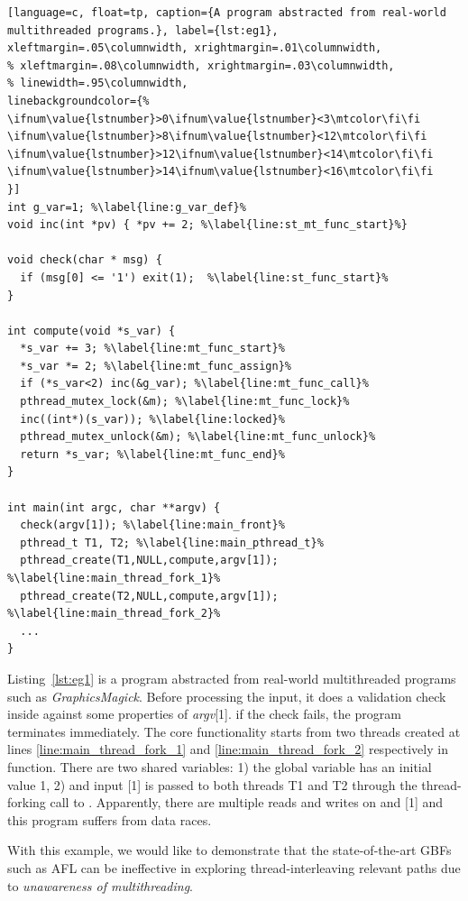 \begin{lstlisting}[language=c, float=tp, caption={A program abstracted from real-world multithreaded programs.}, label={lst:eg1},
xleftmargin=.05\columnwidth, xrightmargin=.01\columnwidth,
% xleftmargin=.08\columnwidth, xrightmargin=.03\columnwidth,
% linewidth=.95\columnwidth, 
linebackgroundcolor={%
\ifnum\value{lstnumber}>0\ifnum\value{lstnumber}<3\mtcolor\fi\fi
\ifnum\value{lstnumber}>8\ifnum\value{lstnumber}<12\mtcolor\fi\fi
\ifnum\value{lstnumber}>12\ifnum\value{lstnumber}<14\mtcolor\fi\fi
\ifnum\value{lstnumber}>14\ifnum\value{lstnumber}<16\mtcolor\fi\fi
}]
int g_var=1; %\label{line:g_var_def}%
void inc(int *pv) { *pv += 2; %\label{line:st_mt_func_start}%}

void check(char * msg) {
  if (msg[0] <= '1') exit(1);  %\label{line:st_func_start}%
}

int compute(void *s_var) {
  *s_var += 3; %\label{line:mt_func_start}%
  *s_var *= 2; %\label{line:mt_func_assign}%
  if (*s_var<2) inc(&g_var); %\label{line:mt_func_call}%
  pthread_mutex_lock(&m); %\label{line:mt_func_lock}%
  inc((int*)(s_var)); %\label{line:locked}%
  pthread_mutex_unlock(&m); %\label{line:mt_func_unlock}%
  return *s_var; %\label{line:mt_func_end}%
}

int main(int argc, char **argv) {
  check(argv[1]); %\label{line:main_front}%
  pthread_t T1, T2; %\label{line:main_pthread_t}%
  pthread_create(T1,NULL,compute,argv[1]);  %\label{line:main_thread_fork_1}%
  pthread_create(T2,NULL,compute,argv[1]);  %\label{line:main_thread_fork_2}%
  ...
}
\end{lstlisting}



Listing~\ref{lst:eg1} is a program abstracted from real-world multithreaded programs such as \emph{GraphicsMagick}. Before processing the input, it does a validation check inside  against some properties of \emph{argv}[1]. if the check fails, the program terminates immediately. The core functionality starts from two threads created at lines \ref{line:main_thread_fork_1} and \ref{line:main_thread_fork_2} respectively in  function. There are two shared variables: 1) the global variable  has an initial value 1, 2) and input [1] is passed to both threads T1 and T2 through the thread-forking call to .
Apparently, there are multiple reads and writes on  and [1] and this program suffers from data races.


 With this example, we would like to demonstrate that the state-of-the-art GBFs such as AFL can be ineffective in exploring thread-interleaving relevant paths due to \emph{unawareness of multithreading}. 






